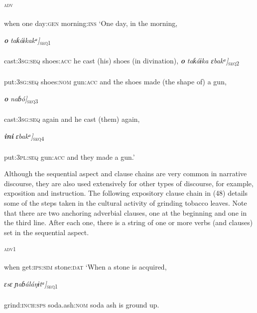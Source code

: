 \ea\label{ex:}
\textsc{\textsubscript{adv}} \\
    \\
when    one    day:\textsc{gen}   morning:\textsc{ins}   
\glt ‘One day, in the morning,  
\z

\ea\label{ex:}
\gll {[ipu}\textbf{\textit{o}}\textit{            taƙáɨkakᵃ]}\textsc{\textsubscript{seq1}} \\
    \\
cast:\textsc{3sg:seq}   shoes:\textsc{acc}
\glt he cast (his) shoes (in divination),
\z  
\ea\label{ex:}
\gll {[eɡu}\textbf{\textit{o}}\textit{           taƙáɨka         ɛbakᵃ]}\textsc{\textsubscript{seq2}} \\
    \\
put:\textsc{3sg:seq}   shoes\textsc{:nom}     gun:\textsc{acc}
\glt and the shoes made (the shape of) a gun,
\z  

\ea\label{ex:}
\gll {[ipu}\textbf{\textit{o}} \textit{           naɓó]}\textsc{\textsubscript{seq3}} \\
    \\
cast:\textsc{3sg:seq}   again 
\glt and he cast (them) again,
\z  

\ea\label{ex:}
\gll {[eɡ}\textbf{\textit{ini}}\textit{      ɛbakᵃ]}\textsc{\textsubscript{seq4}} \\
    \\
put:\textsc{3pl}:\textsc{seq}     gun:\textsc{acc}
\glt and they made a gun.’
\z  

Although the sequential aspect and clause chains are very common in narrative discourse, they are also used extensively for other types of discourse, for example, exposition and instruction. The following expository clause chain in (48) details some of the steps taken in the cultural activity of grinding tobacco leaves. Note that there are two anchoring adverbial clauses, one at the beginning and one in the third line. After each one, there is a string of one or more verbs (and clauses) set in the sequential aspect. 



\ea\label{ex:}
\textsc{\textsubscript{adv1}} \\
    \\
when   get:\textsc{ips:sim}   stone:\textsc{dat}
\glt ‘When a stone is acquired, 
\z



\ea\label{ex:}
\gll {[ŋɔɛ}\textit{ɛsɛ}\textit{     ɲaɓáláŋɨtᵃ]}\textsc{\textsubscript{seq1}} \\
    \\
grind:\textsc{inch:sps}   soda.ash:\textsc{nom}
\glt soda ash is ground up.
\z  


